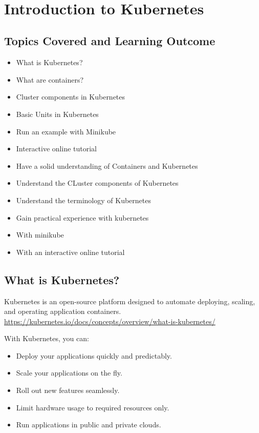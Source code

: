 
\FILENAME\

\chapter{Introduction to Kubernetes}

\section{Topics Covered and Learning Outcome}

\begin{itemize}
\item What is Kubernetes?
\item What are containers?
\item Cluster components in Kubernetes
\item Basic Units in Kubernetes
\item Run an example with Minikube
\item Interactive online tutorial
\item Have a solid understanding of Containers and Kubernetes
\item Understand the CLuster components of Kubernetes
\item Understand the terminology of Kubernetes
\item Gain practical experience with kubernetes
\item With minikube
\item With an interactive online tutorial
\end{itemize}

\section{What is Kubernetes?}

Kubernetes is an open-source platform designed to automate deploying,
scaling, and operating application containers.
\url{https://kubernetes.io/docs/concepts/overview/what-is-kubernetes/}

With Kubernetes, you can:

\begin{itemize}

\item Deploy your applications quickly and predictably.
\item Scale your applications on the fly.
\item Roll out new features seamlessly.
\item Limit hardware usage to required resources only.
\item Run applications in public and private clouds.
\end{itemize}

